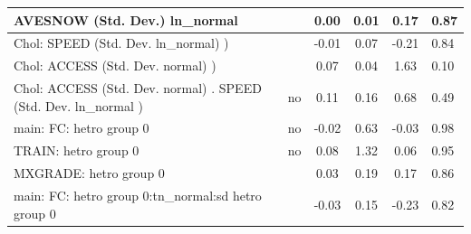 \begin{table}
\begin{center}
\begin{tabular}{|l|l|c|c|c|l|}
			\hline
			AVESNOW (Std. Dev.) ln_normal &  & 0.00 & 0.01 & 0.17 & 0.87 \\
			\hline
			 Chol: SPEED (Std. Dev. ln_normal) ) &  & -0.01 & 0.07 & -0.21 & 0.84 \\
			\hline
			 Chol: ACCESS (Std. Dev. normal) ) &  & 0.07 & 0.04 & 1.63 & 0.10 \\
			\hline
			 Chol: ACCESS (Std. Dev. normal) . SPEED (Std. Dev.   ln_normal ) & no & 0.11 & 0.16 & 0.68 & 0.49 \\
			\hline
			main: FC: hetro group 0 & no & -0.02 & 0.63 & -0.03 & 0.98 \\
			\hline
			TRAIN: hetro group 0 & no & 0.08 & 1.32 & 0.06 & 0.95 \\
			\hline
			MXGRADE: hetro group 0 &  & 0.03 & 0.19 & 0.17 & 0.86 \\
			\hline
			main: FC: hetro group 0:tn_normal:sd  hetro group 0 &  & -0.03 & 0.15 & -0.23 & 0.82 \\
			\hline
		\end{tabular}
	\end{center}
\end{table}